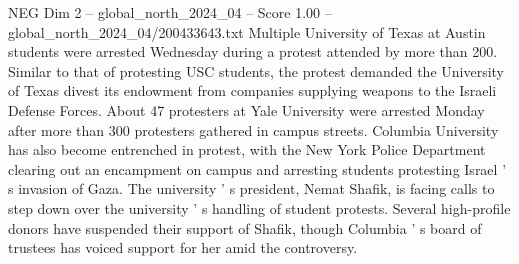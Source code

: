 \begin{textsample}{NEG Dim 2 – global\_north\_2024\_04 – Score 1.00 – global\_north\_2024\_04/200433643.txt}
Multiple University of Texas at Austin students were arrested Wednesday during a protest attended by more than 200.
Similar to that of protesting USC students, the protest demanded the University of Texas divest its endowment from companies supplying weapons to the Israeli Defense Forces.
About 47 protesters at Yale University were arrested Monday after more than 300 protesters gathered in campus streets.
Columbia University has also become entrenched in protest, with the New York Police Department clearing out an encampment on campus and arresting students protesting Israel ' s invasion of Gaza.
The university ' s president, Nemat Shafik, is facing calls to step down over the university ' s handling of student protests.
Several high-profile donors have suspended their support of Shafik, though Columbia ' s board of trustees has voiced support for her amid the controversy.

\end{textsample}
